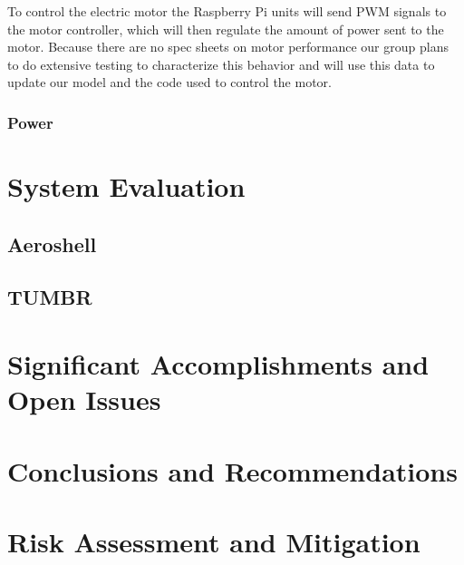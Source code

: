 \indent\indent To control the electric motor the Raspberry Pi units will send PWM signals to the motor controller, which will then regulate the amount of power sent to the motor. Because there are no spec sheets on motor performance our group plans to do extensive testing to characterize this behavior and will use this data to update our model and the code used to control the motor.

\subsubsection{Power}



\section{System Evaluation}

\subsection{Aeroshell}

\subsection{TUMBR}


\section{Significant Accomplishments and Open Issues}


\section{Conclusions and Recommendations}

\section{Risk Assessment and Mitigation}

